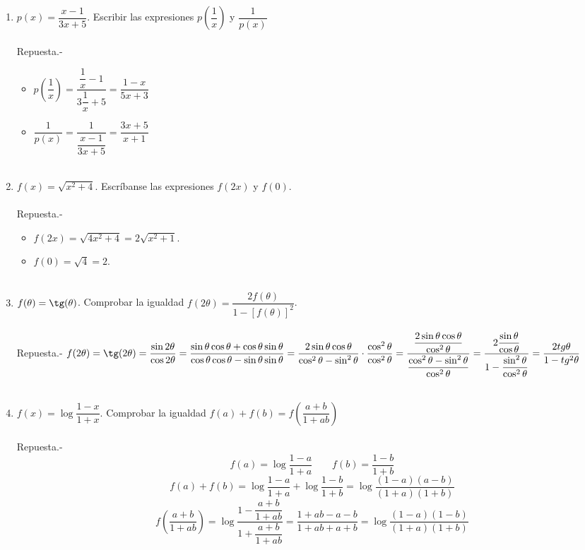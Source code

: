 \begin{enumerate}
\begin{enumerate}[\bfseries a)]
	\end{enumerate}

    \item $p(x) = \dfrac{x-1}{3x+5}$. Escribir las expresiones $p \left(\dfrac{1}{x}\right)$ y $\dfrac{1}{p(x)}$\\\\
	Repuesta.-\;
	\begin{itemize}
	    \item $p\left(\dfrac{1}{x}\right) = \dfrac{\dfrac{1}{x} - 1}{3\dfrac{1}{x} + 5}= \dfrac{1-x}{5x+3}$\\
	    \item $\dfrac{1}{p(x)} = \dfrac{1}{\dfrac{x-1}{3x+5}} = \dfrac{3x+5}{x+1}$\\\\
	\end{itemize}

    \item $f(x)=\sqrt{x^2 + 4}$. Escríbanse las expresiones $f(2x)$ y $f(0)$.\\\\
	Repuesta.-\; 
	\begin{itemize}
	    \item $f(2x)=\sqrt{4x^2 + 4} = 2\sqrt{x^2 + 1}$.
	    \item $f(0)=\sqrt{4}=2$.\\\\
	\end{itemize}

    \item $f(\theta)=\tg(\theta)$. Comprobar la igualdad $f(2\theta)=\dfrac{2f(\theta)}{1-\left[f(\theta)\right]^2}$.\\\\
	Repuesta.-\; $f(2\theta)=\tg(2\theta )= \dfrac{\sin 2\theta}{\cos 2\theta} = \dfrac{\sin \theta \cos \theta + \cos \theta \sin \theta}{\cos \theta \cos \theta - \sin \theta \sin \theta} = \dfrac{2\sin \theta \cos \theta}{\cos^2 \theta - \sin^2\theta}\cdot \dfrac{\cos^2 \theta}{\cos^2 \theta} = \dfrac{\dfrac{2\sin \theta \cos \theta}{\cos^2 \theta}}{\dfrac{\cos^2 \theta - \sin^2 \theta}{\cos^2 \theta}} = \dfrac{2\dfrac{\sin \theta}{\cos \theta}}{1-\dfrac{\sin^2 \theta}{\cos^2 \theta}} = \dfrac{2tg \theta}{1- tg^2 \theta}$\\\\

    \item $f(x)=\log \dfrac{1-x}{1+x}$. Comprobar la igualdad $f(a)+f(b)=f\left(\dfrac{a+b}{1+ab}\right)$ \\\\
	Repuesta.-\; $$f(a)=\log \dfrac{1-a}{1+a} \qquad f(b)=\dfrac{1-b}{1+b}$$ 
	$$f(a)+f(b)=\log \dfrac{1-a}{1+a} + \log\dfrac{1-b}{1+b}=\log \dfrac{(1-a)(a-b)}{(1+a)(1+b)}$$
	$$f\left(\dfrac{a+b}{1+ab}\right)=\log \dfrac{1-\dfrac{a+b}{1+ab}}{1+\dfrac{a+b}{1+ab}}=\dfrac{1+ab-a-b}{1+ab+a+b}=\log \dfrac{(1-a)(1-b)}{(1+a)(1+b)}$$\\\\
 
\end{enumerate}
